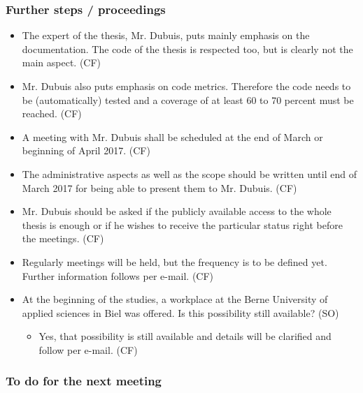 \documentclass[10pt, openright, notitlepage]{scrreprt}
\begin{document}
\subsubsection{Further steps / proceedings}
\label{sec:orgf1f0481}

\begin{itemize}
\item The expert of the thesis, Mr. Dubuis, puts mainly emphasis on the
documentation. The code of the thesis is respected too, but is clearly not the
main aspect. (CF)
\item Mr. Dubuis also puts emphasis on code metrics. Therefore the code needs to be
(automatically) tested and a coverage of at least 60 to 70 percent must be
reached. (CF)
\item A meeting with Mr. Dubuis shall be scheduled at the end of March or beginning
of April 2017. (CF)
\item The administrative aspects as well as the scope should be written until end of
March 2017 for being able to present them to Mr. Dubuis. (CF)
\item Mr. Dubuis should be asked if the publicly available access to the whole
thesis is enough or if he wishes to receive the particular status right before
the meetings. (CF)
\item Regularly meetings will be held, but the frequency is to be defined yet.
Further information follows per e-mail. (CF)
\item At the beginning of the studies, a workplace at the Berne University of
applied sciences in Biel was offered. Is this possibility still available?
(SO)
\begin{itemize}
\item Yes, that possibility is still available and details will be clarified and
follow per e-mail. (CF)
\end{itemize}
\end{itemize}

\subsubsection{To do for the next meeting}
\label{sec:orgb401b11}
\end{document}
